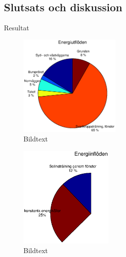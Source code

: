 \subsection{Slutsats och diskussion}

\begin{frame}{Resultat}

\begin{figure}[hpbt]
\centering
\includegraphics[height=5cm]{images/totalflow_in.eps}
\caption{\label{fig:foundation}{Bildtext}}
\end{figure}

\begin{figure}[hpbt]
\centering
\includegraphics[height=5cm]{images/totalflow_out.eps}
\caption{\label{fig:foundation}{Bildtext}}
\end{figure}

\end{frame}
